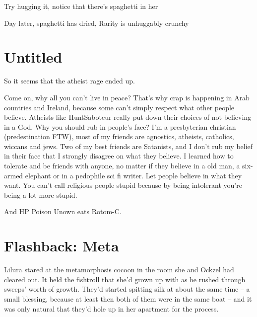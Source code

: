 \documentclass[a1paper]{article}
\begin{document}
\begin{multicols}{7}
{\textrangle \hspace{0.1em} Try hugging it, notice that there's spaghetti in her

\textrangle \hspace{0.1em} Day later, spaghetti has dried, Rarity is unhuggably crunchy


\setlength{\parskip}{0.8em}
















\section{Untitled}
So it seems that the atheist rage ended up.

Come on, why all you can't live in peace? That's why crap is happening in Arab countries and Ireland, because some can't simply respect what other people believe. Atheists like HuntSaboteur really put down their choices of not believing in a God. Why you should rub in people's face? I'm a presbyterian christian (predestination FTW), most of my friends are agnostics, atheists, catholics, wiccans and jews. Two of my best friends are Satanists, and I don't rub my belief in their face that I strongly disagree on what they believe. I learned how to tolerate and be friends with anyone, no matter if they believe in a old man, a six-armed elephant or in a pedophile sci fi writer. Let people believe in what they want. You can't call religious people stupid because by being intolerant you're being a lot more stupid.

And HP Poison Unown eats Rotom-C.












\section{Flashback: Meta}
Lilura stared at the metamorphosis cocoon in the room she and Ockzel had cleared out.  It held the fishtroll that she'd grown up with as he rushed through sweeps' worth of growth.  They'd started spitting silk at about the same time – a small blessing, because at least then both of them were in the same boat – and it was only natural that they'd hole up in her apartment for the process.

}
\end{multicols}
\end{document}

